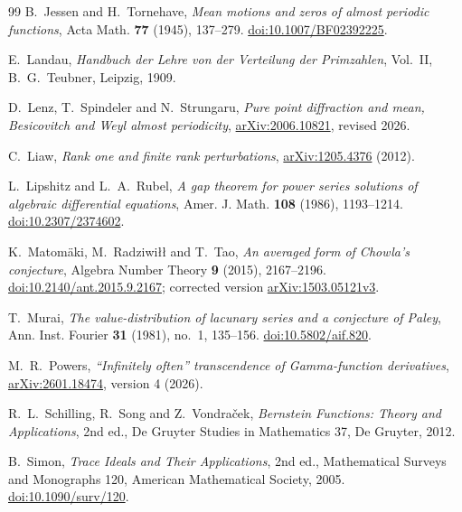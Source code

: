 \documentclass[11pt]{article}
\theoremstyle{definition}
\theoremstyle{remark}
\begin{document}
\begin{thebibliography}{99}
B.~Jessen and H.~Tornehave,
\emph{Mean motions and zeros of almost periodic functions},
Acta Math. \textbf{77} (1945), 137--279.
\href{https://doi.org/10.1007/BF02392225}{doi:10.1007/BF02392225}.

E.~Landau,
\emph{Handbuch der Lehre von der Verteilung der Primzahlen}, Vol.~II,
B.~G.~Teubner, Leipzig, 1909.

D.~Lenz, T.~Spindeler and N.~Strungaru,
\emph{Pure point diffraction and mean, Besicovitch and Weyl almost periodicity},
\href{https://arxiv.org/abs/2006.10821}{arXiv:2006.10821}, revised 2026.

C.~Liaw,
\emph{Rank one and finite rank perturbations},
\href{https://arxiv.org/abs/1205.4376}{arXiv:1205.4376} (2012).

L.~Lipshitz and L.~A.~Rubel,
\emph{A gap theorem for power series solutions of algebraic differential equations},
Amer. J. Math. \textbf{108} (1986), 1193--1214.
\href{https://doi.org/10.2307/2374602}{doi:10.2307/2374602}.

K.~Matom\"aki, M.~Radziwi\l\l{} and T.~Tao,
\emph{An averaged form of Chowla's conjecture},
Algebra Number Theory \textbf{9} (2015), 2167--2196.
\href{https://doi.org/10.2140/ant.2015.9.2167}{doi:10.2140/ant.2015.9.2167};
corrected version \href{https://arxiv.org/abs/1503.05121v3}{arXiv:1503.05121v3}.

T.~Murai,
\emph{The value-distribution of lacunary series and a conjecture of Paley},
Ann. Inst. Fourier \textbf{31} (1981), no.~1, 135--156.
\href{https://doi.org/10.5802/aif.820}{doi:10.5802/aif.820}.

M.~R.~Powers,
\emph{``Infinitely often'' transcendence of Gamma-function derivatives},
\href{https://arxiv.org/abs/2601.18474}{arXiv:2601.18474}, version 4 (2026).

R.~L.~Schilling, R.~Song and Z.~Vondra\v{c}ek,
\emph{Bernstein Functions: Theory and Applications}, 2nd ed.,
De Gruyter Studies in Mathematics 37, De Gruyter, 2012.

B.~Simon,
\emph{Trace Ideals and Their Applications}, 2nd ed.,
Mathematical Surveys and Monographs 120, American Mathematical Society, 2005.
\href{https://doi.org/10.1090/surv/120}{doi:10.1090/surv/120}.

\end{thebibliography}
\end{document}
